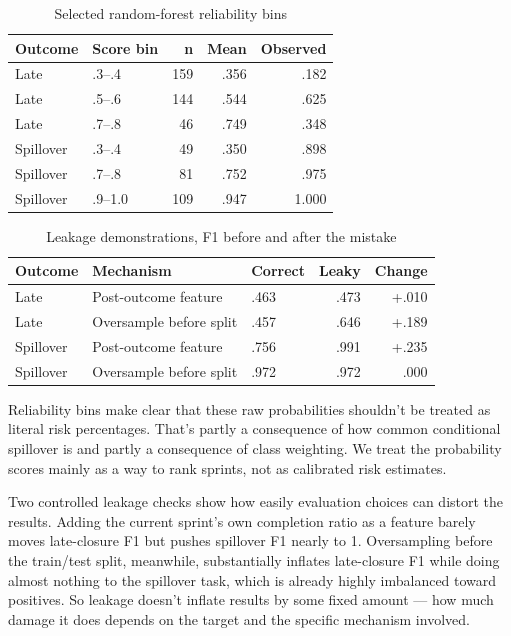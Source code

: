 \documentclass[conference]{IEEEtran}
\begin{document}
\begin{table}[!htb]
\centering\scriptsize
\caption{Selected random-forest reliability bins}
\label{tab:calbins}
\setlength{\tabcolsep}{2.5pt}
\begin{tabular}{@{}llrrr@{}}
\toprule
Outcome & Score bin & n & Mean & Observed\\
\midrule
Late & .3--.4 & 159 & .356 & .182\\
Late & .5--.6 & 144 & .544 & .625\\
Late & .7--.8 & 46 & .749 & .348\\
Spillover & .3--.4 & 49 & .350 & .898\\
Spillover & .7--.8 & 81 & .752 & .975\\
Spillover & .9--1.0 & 109 & .947 & 1.000\\
\bottomrule
\end{tabular}
\end{table}

\begin{table}[!htb]
\centering\scriptsize
\caption{Leakage demonstrations, F1 before and after the mistake}
\label{tab:leak}
\setlength{\tabcolsep}{2.6pt}
\begin{tabular}{@{}lllrr@{}}
\toprule
Outcome & Mechanism & Correct & Leaky & Change\\
\midrule
Late & Post-outcome feature & .463 & .473 & +.010\\
Late & Oversample before split & .457 & .646 & +.189\\
Spillover & Post-outcome feature & .756 & .991 & +.235\\
Spillover & Oversample before split & .972 & .972 & .000\\
\bottomrule
\end{tabular}
\end{table}

Reliability bins make clear that these raw probabilities shouldn't be treated as literal risk percentages. That's partly a consequence of how common conditional spillover is and partly a consequence of class weighting. We treat the probability scores mainly as a way to rank sprints, not as calibrated risk estimates.

Two controlled leakage checks show how easily evaluation choices can distort the results. Adding the current sprint's own completion ratio as a feature barely moves late-closure F1 but pushes spillover F1 nearly to 1. Oversampling before the train/test split, meanwhile, substantially inflates late-closure F1 while doing almost nothing to the spillover task, which is already highly imbalanced toward positives. So leakage doesn't inflate results by some fixed amount --- how much damage it does depends on the target and the specific mechanism involved.
\end{document}
